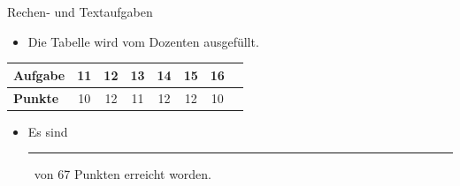 \documentclass[a4paper, 9pt]{scrartcl}\usepackage[]{graphicx}\usepackage[]{xcolor}
\begin{document}
\begin{graybox}{Rechen- und Textaufgaben}
  \begin{itemize}
  \item Die Tabelle wird vom Dozenten ausgefüllt.
  \end{itemize}
  \begin{center}
    \large
    \begin{tabular}{|l|c|c|c|c|c|c|c|}
      \hline
      \textbf{Aufgabe} & \textbf{11} & \textbf{12} & \textbf{13} & \textbf{14} & \textbf{15} &  \textbf{16} \strut\\
      \hline
      \textbf{Punkte} & 
      \hspace{1Ex}\Large\textcolor{gray!70}{10}\hspace{1Ex}  & 
      \hspace{1Ex}\Large\textcolor{gray!70}{12}\hspace{1Ex}  & 
      \hspace{1Ex}\Large\textcolor{gray!70}{11}\hspace{1Ex}  & 
      \hspace{1Ex}\Large\textcolor{gray!70}{12}\hspace{1Ex}  & 
      \hspace{1Ex}\Large\textcolor{gray!70}{12}\hspace{1Ex}  & 
      \hspace{1Ex}\Large\textcolor{gray!70}{10}\hspace{1Ex}  \strut\\
      \hline
  \end{tabular}
\end{center}
\begin{itemize}
\item Es sind \rule[0ex]{2em}{.4pt}\, von 67 Punkten erreicht worden.
\end{itemize}
\end{graybox}

\clearpage
\end{document}
